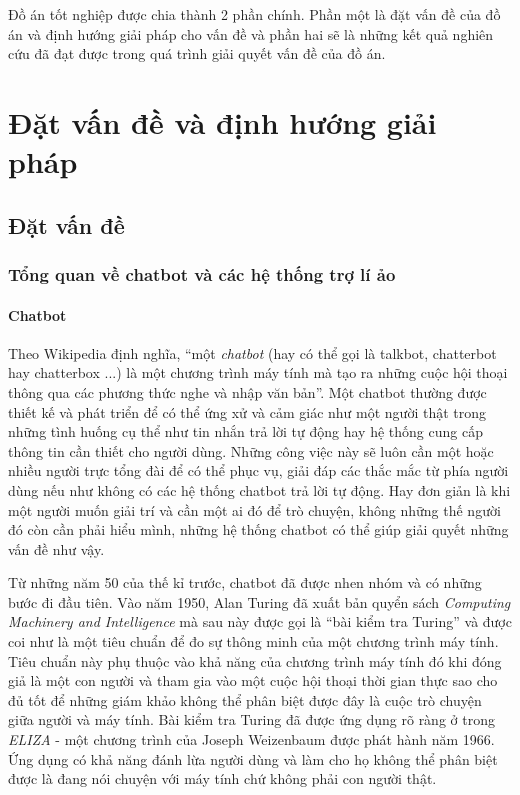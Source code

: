 \documentclass[12pt]{report}
\begin{document}
Đồ án tốt nghiệp được chia thành 2 phần chính. Phần một là đặt vấn đề của đồ án và định hướng giải pháp cho vấn đề và phần hai sẽ là những kết quả nghiên cứu đã đạt được trong quá trình giải quyết vấn đề của đồ án.

\newpage
\setcounter{page}{1}

\newcommand{\alice}{A.L.I.C.E}

\part{Đặt vấn đề và định hướng giải pháp}

\startcontents[parts]

\chapter{Đặt vấn đề}
\section{Tổng quan về chatbot và các hệ thống trợ lí ảo}
\subsection{Chatbot}
Theo Wikipedia định nghĩa, ``một \textit{chatbot} (hay có thể gọi là talkbot, chatterbot hay chatterbox ...) là một chương trình máy tính mà tạo ra những cuộc hội thoại thông qua các phương thức nghe và nhập văn bản''. Một chatbot thường được thiết kế và phát triển để có thể ứng xử và cảm giác như một người thật trong những tình huống cụ thể như tin nhắn trả lời tự động hay hệ thống cung cấp thông tin cần thiết cho người dùng. Những công việc này sẽ luôn cần một hoặc nhiều người trực tổng đài để có thể phục vụ, giải đáp các thắc mắc từ phía người dùng nếu như không có các hệ thống chatbot trả lời tự động. Hay đơn giản là khi một người muốn giải trí và cần một ai đó để trò chuyện, không những thế người đó còn cần phải hiểu mình, những hệ thống chatbot có thể giúp giải quyết những vấn đề như vậy.

Từ những năm 50 của thế kỉ trước, chatbot đã được nhen nhóm và có những bước đi đầu tiên. Vào năm 1950, Alan Turing đã xuất bản quyển sách \textit{Computing Machinery and Intelligence} mà sau này được gọi là ``bài kiểm tra Turing'' và được coi như là một tiêu chuẩn để đo sự thông minh của một chương trình máy tính. Tiêu chuẩn này phụ thuộc vào khả năng của chương trình máy tính đó khi đóng giả là một con người và tham gia vào một cuộc hội thoại thời gian thực sao cho đủ tốt để những giám khảo không thể phân biệt được đây là cuộc trò chuyện giữa người và máy tính. Bài kiểm tra Turing đã được ứng dụng rõ ràng ở trong \textit{ELIZA} - một chương trình của Joseph Weizenbaum được phát hành năm 1966. Ứng dụng có khả năng đánh lừa người dùng và làm cho họ không thể phân biệt được là đang nói chuyện với máy tính chứ không phải con người thật.
\end{document}
